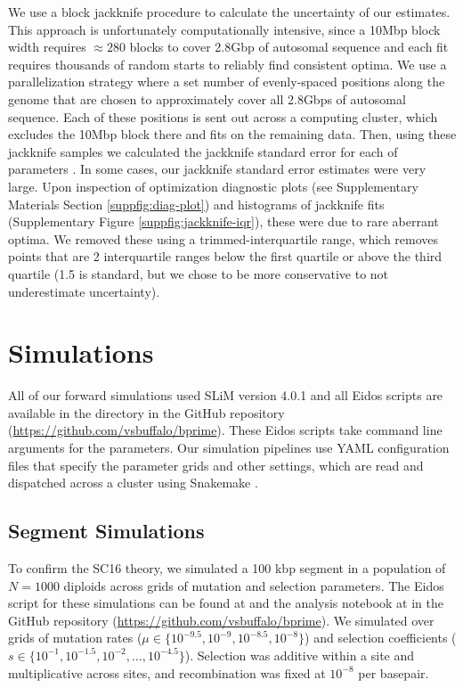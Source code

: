 \documentclass[11pt]{article}
\begin{document}
We use a block jackknife procedure to calculate the uncertainty of our
estimates. This approach is unfortunately computationally intensive, since a
10Mbp block width requires $\approx 280$ blocks to cover 2.8Gbp of autosomal
sequence and each fit requires thousands of random starts to reliably find
consistent optima. We use a parallelization strategy where a set number of
evenly-spaced positions along the genome that are chosen to approximately cover
all 2.8Gbps of autosomal sequence. Each of these positions is sent out across a
computing cluster, which excludes the 10Mbp block there and fits on the
remaining data. Then, using these jackknife samples we calculated the jackknife
standard error for each of parameters \parencite{Wasserman2004-ip}. In some
cases, our jackknife standard error estimates were very large. Upon inspection
of optimization diagnostic plots (see Supplementary Materials Section
\ref{suppfig:diag-plot}) and histograms of jackknife fits (Supplementary Figure
\ref{suppfig:jackknife-iqr}), these were due to rare aberrant optima. We
removed these using a trimmed-interquartile range, which removes points that
are 2 interquartile ranges below the first quartile or above the third quartile
(1.5 is standard, but we chose to be more conservative to not underestimate
uncertainty).

\section{Simulations}
\label{supp:simulation}

All of our forward simulations used SLiM version 4.0.1
\parencite{Haller2019-vu,Haller2023-uk} and all Eidos scripts are available in
the  directory in the GitHub repository
(\url{https://github.com/vsbuffalo/bprime}). These Eidos scripts take command
line arguments for the parameters. Our simulation pipelines use YAML
configuration files that specify the parameter grids and other settings, which
are read and dispatched across a cluster using Snakemake
\parencite{Koster2012-iv}.

\subsection{Segment Simulations}

To confirm the SC16 theory, we simulated a 100 kbp segment in a population of
$N=1000$ diploids across grids of mutation and selection parameters. The Eidos
script for these simulations can be found at
 and the analysis notebook at
 in the GitHub repository
(\url{https://github.com/vsbuffalo/bprime}). We simulated over grids of
mutation rates ($\mu \in \{10^{-9.5}, 10^{-9}, 10^{-8.5}, 10^{-8}\}$) and
selection coefficients ($s \in \{10^{-1}, 10^{-1.5}, 10^{-2}, \ldots,
10^{-4.5}\}$). Selection was additive within a site and multiplicative across
sites, and recombination was fixed at $10^{-8}$ per basepair.
\end{document}
